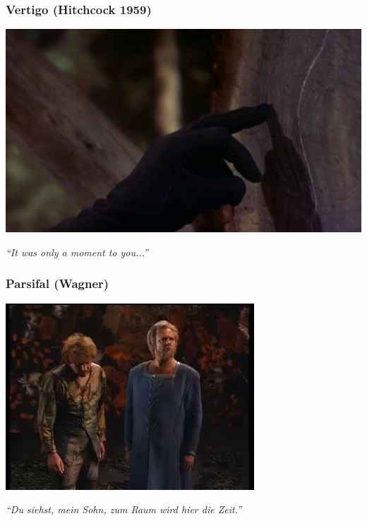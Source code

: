 \documentclass[]{beamer}
\begin{document}
\begin{frame}
  \frametitle{Vertigo (Hitchcock 1959)}
  \begin{center}
    \href{run:media/vertigo-test.avi}{\includegraphics[width=.8\textwidth]{media/vertigo-finger.jpg}}
  \end{center}
  \begin{center}
    \emph{``It was only a moment to you...''}
  \end{center}
\end{frame}

\begin{frame}
  \frametitle{Parsifal (Wagner)}
  \begin{center}
    \href{run:media/Parsifal.mp4}{\includegraphics[width=.6\textwidth]{media/parsifal-splash.jpg}}
  \end{center}
  \begin{center}
    \emph{``Du siehst, mein Sohn, zum Raum wird hier die Zeit.''}
  \end{center}
\end{frame}
\end{document}
